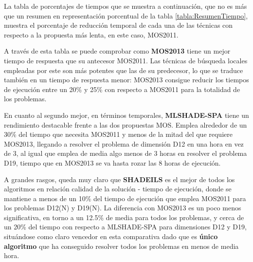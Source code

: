  La tabla de porcentajes de tiempos que se muestra a continuación, que no es más que un resumen en representación porcentual de la tabla \ref{tabla:ResumenTiempo}, muestra el porcentaje de reducción temporal de cada una de las técnicas con respecto a la propuesta más lenta, en este caso, MOS2011.
 
 \begin{table}[h]
 	\centering
 	\caption{Porcentaje (\%) de reducción temporal }
 	\label{tabla:ResumenTiempoPorcentaje}
 \end{table}

A través de esta tabla se puede comprobar como \textbf{MOS2013} tiene un mejor tiempo de respuesta que su antecesor MOS2011. Las técnicas de búsqueda locales empleadas por este son más potentes que las de su predecesor, lo que se traduce también en un tiempo de respuesta menor: MOS2013 consigue reducir los tiempos de ejecución entre un 20\% y 25\% con respecto a MOS2011 para la totalidad de los problemas.

En cuanto al segundo mejor, en términos temporales, \textbf{MLSHADE-SPA} tiene un rendimiento destacable frente a las dos propuestas MOS. Emplea alrededor de un 30\% del tiempo que necesita MOS2011 y menos de la mitad del que requiere MOS2013, llegando a resolver el problema de dimensión D12 en una hora en vez de 3, al igual que emplea de media algo menos de 3 horas en resolver el problema D19, tiempo que en MOS2013 se va hasta rozar las 8 horas de ejecución.

A grandes rasgos, queda muy claro que \textbf{SHADEILS} es el mejor de todos los algoritmos en relación calidad de la solución - tiempo de ejecución, donde se mantiene a menos de un 10\% del tiempo de ejecución que emplea MOS2011 para los problemas D12(N) y D19(N). La diferencia con MOS2013 es un poco menos significativa, en torno a un 12.5\% de media para todos los problemas, y cerca de un 20\% del tiempo con respecto a MLSHADE-SPA para dimensiones D12 y D19, situándose como claro vencedor en esta comparativa dado que es \textbf{único algoritmo} que ha conseguido resolver todos los problemas en menos de media hora.


